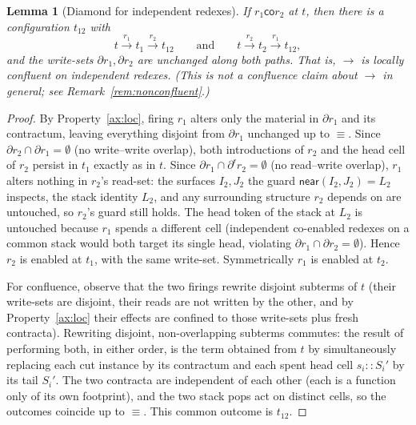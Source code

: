 \documentclass[11pt]{article}
\theoremstyle{definition}
\theoremstyle{plain}
\newtheorem{lemma}[definition]{Lemma}
\newcommand{\near}{\mathsf{near}}
\newcommand{\cons}{\mathbin{::}}        %
\newcommand{\Seq}{\equiv}
\newcommand{\red}{\longrightarrow}
\newcommand{\foot}{\partial}                       %
\newcommand{\rfoot}{\partial^{\mathsf r}}          %
\newcommand{\fire}[1]{\xrightarrow{\;#1\;}}
\newcommand{\co}{\mathbin{\mathsf{co}}}            %
\theoremstyle{remark}
\begin{document}
\begin{lemma}[Diamond for independent redexes]
\label{lem:diamond}
If $r_1 \co r_2$ at $t$, then there is a configuration $t_{12}$ with
\[
  t \fire{r_1} t_1 \fire{r_2} t_{12}
  \qquad\text{and}\qquad
  t \fire{r_2} t_2 \fire{r_1} t_{12},
\]
and the write-sets $\foot r_1, \foot r_2$ are unchanged along both
paths. That is, $\red$ is locally confluent \emph{on independent
redexes}. (This is not a confluence claim about $\red$ in general; see
Remark~\ref{rem:nonconfluent}.)
\end{lemma}

\begin{proof}
By Property~\ref{ax:loc}, firing $r_1$ alters only the material in
$\foot r_1$ and its contractum, leaving everything disjoint from
$\foot r_1$ unchanged up to $\Seq$. Since $\foot r_2 \cap \foot r_1 =
\emptyset$ (no write--write overlap), both introductions of $r_2$ and the
head cell of $r_2$ persist in $t_1$ exactly as in $t$. Since $\foot r_1
\cap \rfoot r_2 = \emptyset$ (no read--write overlap), $r_1$ alters
nothing in $r_2$'s read-set: the surfaces $I_2, J_2$ the guard
$\near(I_2,J_2)=L_2$ inspects, the stack identity $L_2$, and any
surrounding structure $r_2$ depends on are untouched, so $r_2$'s guard
still holds. The head token of the stack at $L_2$ is untouched because
$r_1$ spends a different cell (independent co-enabled redexes on a common
stack would both target its single head, violating
$\foot r_1 \cap \foot r_2 = \emptyset$). Hence $r_2$ is enabled at $t_1$,
with the same write-set. Symmetrically $r_1$ is enabled at $t_2$.

For confluence, observe that the two firings rewrite disjoint subterms
of $t$ (their write-sets are disjoint, their reads are not written by the
other, and by Property~\ref{ax:loc} their effects are confined to those
write-sets plus fresh contracta). Rewriting disjoint, non-overlapping
subterms commutes: the result of performing both, in either order, is the
term obtained from $t$ by simultaneously replacing each cut instance by
its contractum and each spent head cell $s_i \cons S_i'$ by its tail
$S_i'$. The two contracta are independent of each other (each is a
function only of its own footprint), and the two stack pops act on
distinct cells, so the outcomes coincide up to $\Seq$. This common
outcome is $t_{12}$.
\end{proof}
\end{document}
